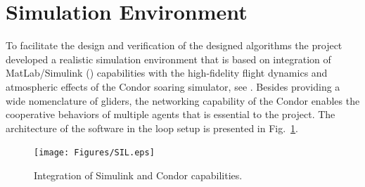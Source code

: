 \documentclass{ifacconf}
\newcommand{\squeezeup}{\vspace{-3.0mm}}
\begin{document}
\section{Simulation Environment}
\label{sec:SimEnv}
\squeezeup

To facilitate the design and verification of the designed algorithms the
project developed a realistic simulation environment that is based on
integration of MatLab/Simulink (\cite{MATLAB:2013}) capabilities with the
high-fidelity flight dynamics and atmospheric effects of the Condor soaring
simulator, see \cite{Condor:2013:Online}. Besides providing a wide
nomenclature of gliders, the networking capability of the Condor enables the
cooperative behaviors of multiple agents that is essential to the project.
The architecture of the software in the loop setup is presented in
Fig.~\ref{fig:SIL}.
%

\begin{figure}[thpb]
  \centering
  \texttt{[image: Figures/SIL.eps]}
  \caption{Integration of Simulink and Condor capabilities.}
  \label{fig:SIL}
\end{figure}
\end{document}
